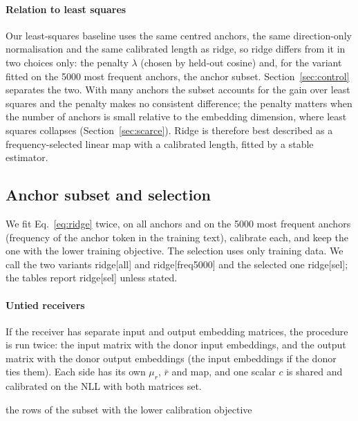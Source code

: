 \documentclass[preprint,12pt]{elsarticle}
\begin{document}
\paragraph{Relation to least squares} Our least-squares baseline uses the same centred anchors, the same direction-only normalisation and the same calibrated length as ridge, so ridge differs from it in two choices only: the penalty $\lambda$ (chosen by held-out cosine) and, for the variant fitted on the 5000 most frequent anchors, the anchor subset. Section~\ref{sec:control} separates the two. With many anchors the subset accounts for the gain over least squares and the penalty makes no consistent difference; the penalty matters when the number of anchors is small relative to the embedding dimension, where least squares collapses (Section~\ref{sec:scarce}). Ridge is therefore best described as a frequency-selected linear map with a calibrated length, fitted by a stable estimator.
\subsection{Anchor subset and selection}
We fit Eq.~\eqref{eq:ridge} twice, on all anchors and on the 5000 most frequent anchors (frequency of the anchor token in the training text), calibrate each, and keep the one with the lower training objective. The selection uses only training data. We call the two variants ridge[all] and ridge[freq5000] and the selected one ridge[sel]; the tables report ridge[sel] unless stated.

\paragraph{Untied receivers}\label{par:untied} If the receiver has separate input and output embedding matrices, the procedure is run twice: the input matrix with the donor input embeddings, and the output matrix with the donor output embeddings (the input embeddings if the donor ties them). Each side has its own $\mu_r$, $\bar r$ and map, and one scalar $c$ is shared and calibrated on the NLL with both matrices set.

\begin{algorithm}[t]
\caption{Calibrated ridge initialisation}
\label{alg:ridge}
\Return the rows of the subset with the lower calibration objective\;
\end{algorithm}
\end{document}
